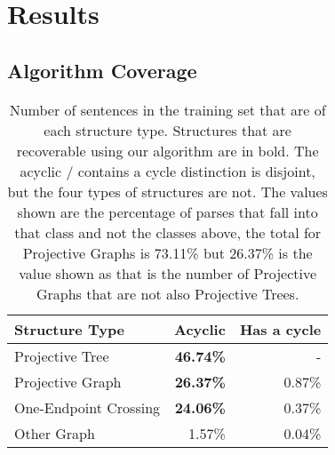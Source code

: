 
\section{Results}

\subsection{Algorithm Coverage} \label{sec:results-coverage}

\begin{table}
  \centering
  \begin{tabular}{|lrr|}
    \hline
    Structure Type & Acyclic & Has a cycle \\
    \hline
    \hline
    Projective Tree & \textbf{46.74\%} & - \\
    Projective Graph & \textbf{26.37\%} & 0.87\% \\
    One-Endpoint Crossing & \textbf{24.06\%} & 0.37\% \\
    Other Graph & 1.57\% & 0.04\% \\
    \hline
  \end{tabular}
  \caption[Number of sentences in the training set that are of each structure type.]{ \label{tab:structures}
    Number of sentences in the training set that are of each structure type.
    Structures that are recoverable using our algorithm are in bold.
    The acyclic / contains a cycle distinction is disjoint, but the four types of structures are not.
    The values shown are the percentage of parses that fall into that class and not the classes above, \myie the total for Projective Graphs is 73.11\% but 26.37\% is the value shown as that is the number of Projective Graphs that are not also Projective Trees.
  }
\end{table}

